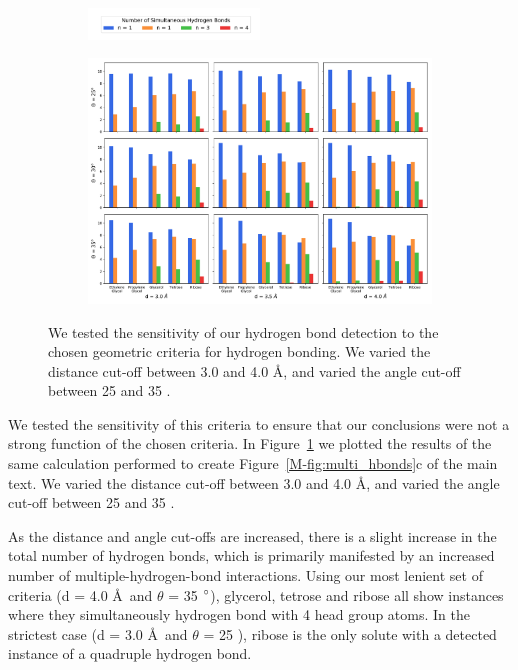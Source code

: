 \documentclass{article}
\begin{document}
  \begin{figure}[!htb]
  \centering
  \begin{subfigure}{\textwidth}
  \centering
  \includegraphics[trim={0 0.5cm 0.5cm 0.5cm}, clip, width=0.5\textwidth]{hbond_sensitivity_legend.pdf}
  \end{subfigure}
  \begin{subfigure}{\textwidth}
  \includegraphics[width=\textwidth]{hbond_sensitivity.pdf}
  \end{subfigure}
  \caption{We tested the sensitivity of our hydrogen bond detection to the chosen 
  geometric criteria for hydrogen bonding. We varied the distance cut-off between 3.0 and
  4.0 \AA, and varied the angle cut-off between 25 and 35 \degree.}\label{fig:hbond_sensitivity}
  \end{figure}
  
  We tested the sensitivity of this criteria to ensure that our conclusions
  were not a strong function of the chosen criteria. In Figure~\ref{fig:hbond_sensitivity} we
  plotted the results of the same calculation performed to create Figure~\ref{M-fig:multi_hbonds}c
  of the main text. We varied the distance cut-off between 3.0 and 4.0 \AA, and varied the
  angle cut-off between 25 and 35 \degree. 
  
  As the distance and angle cut-offs are increased, there is a slight increase in the total
  number of hydrogen bonds, which is primarily manifested by an increased number of multiple-hydrogen-bond
  interactions. Using our most lenient set of criteria (d = 4.0 \AA~and $\theta$ = 35 $\degree$), glycerol,
  tetrose and ribose all show instances where they simultaneously hydrogen bond with 4 head group atoms.
  In the strictest case (d = 3.0 \AA~and $\theta$ = 25 \degree), ribose is the only solute with a 
  detected instance of a quadruple hydrogen bond.
  
\end{document}
